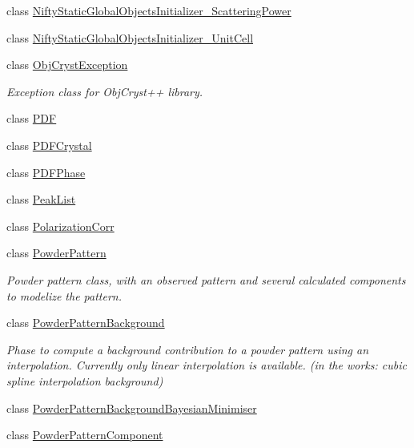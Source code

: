 \begin{DoxyCompactItemize}
\item 
class \mbox{\hyperlink{class_obj_cryst_1_1_nifty_static_global_objects_initializer___scattering_power}{Nifty\+Static\+Global\+Objects\+Initializer\+\_\+\+Scattering\+Power}}
\item 
class \mbox{\hyperlink{class_obj_cryst_1_1_nifty_static_global_objects_initializer___unit_cell}{Nifty\+Static\+Global\+Objects\+Initializer\+\_\+\+Unit\+Cell}}
\item 
class \mbox{\hyperlink{class_obj_cryst_1_1_obj_cryst_exception}{Obj\+Cryst\+Exception}}
\begin{DoxyCompactList}\small\item\em Exception class for Obj\+Cryst++ library. \end{DoxyCompactList}\item 
class \mbox{\hyperlink{class_obj_cryst_1_1_p_d_f}{P\+DF}}
\item 
class \mbox{\hyperlink{class_obj_cryst_1_1_p_d_f_crystal}{P\+D\+F\+Crystal}}
\item 
class \mbox{\hyperlink{class_obj_cryst_1_1_p_d_f_phase}{P\+D\+F\+Phase}}
\item 
class \mbox{\hyperlink{class_obj_cryst_1_1_peak_list}{Peak\+List}}
\item 
class \mbox{\hyperlink{class_obj_cryst_1_1_polarization_corr}{Polarization\+Corr}}
\item 
class \mbox{\hyperlink{class_obj_cryst_1_1_powder_pattern}{Powder\+Pattern}}
\begin{DoxyCompactList}\small\item\em Powder pattern class, with an observed pattern and several calculated components to modelize the pattern. \end{DoxyCompactList}\item 
class \mbox{\hyperlink{class_obj_cryst_1_1_powder_pattern_background}{Powder\+Pattern\+Background}}
\begin{DoxyCompactList}\small\item\em Phase to compute a background contribution to a powder pattern using an interpolation. Currently only linear interpolation is available. (in the works\+: cubic spline interpolation background) \end{DoxyCompactList}\item 
class \mbox{\hyperlink{class_obj_cryst_1_1_powder_pattern_background_bayesian_minimiser}{Powder\+Pattern\+Background\+Bayesian\+Minimiser}}
\item 
class \mbox{\hyperlink{class_obj_cryst_1_1_powder_pattern_component}{Powder\+Pattern\+Component}}

\end{DoxyCompactItemize}
